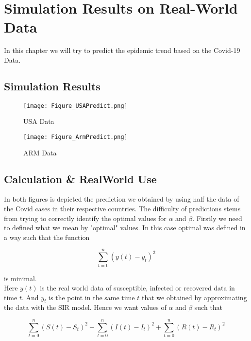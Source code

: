 \section{Simulation Results on Real-World Data}\label{Real_world}\thispagestyle{SectionFirstPage} %
In this chapter we will try to predict the epidemic trend based on the Covid-19 Data.

\subsection{Simulation Results}\label{figures}
\begin{figure}[H]
	\caption{USA Data}
	\centering
	\texttt{[image: Figure\_USAPredict.png]}
\end{figure}
\begin{figure}[H]
	\caption{ARM Data}
	\centering
	\texttt{[image: Figure\_ArmPredict.png]}
\end{figure}

\pagebreak

\subsection{Calculation \& RealWorld Use}\label{Applicaltions}
In both figures is depicted the prediction we obtained by using half the data 
of the Covid cases in their respective countries. The difficulty of predictions stems from
trying to correctly identify the optimal values for $\alpha$ and $\beta$. Firstly we need to defined what we mean 
by "optimal" values. In this case optimal was defined in a way such that the function

\begin{equation*}
	\sum_{t=0}^{n} (y(t)-y_t)^2 
\end{equation*}

is minimal. \\

Here $y(t)$ is the real world data of susceptible, infected or recovered data in time $t$. 
And $y_t$ is the point in the same time $t$ that we obtained by approximating the data with the SIR model.
Hence we want values of $\alpha$ and $\beta$ such that

\begin{equation*}
	\sum_{t=0}^{n} (S(t)-S_t)^2 + \sum_{t=0}^{n} (I(t)-I_t)^2 + \sum_{t=0}^{n} (R(t)-R_t)^2
\end{equation*}

